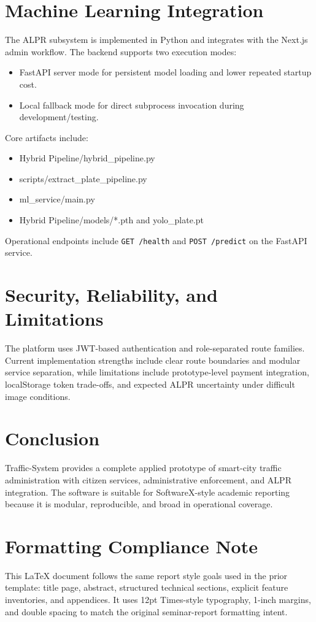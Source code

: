 \documentclass[12pt]{article}
\begin{document}
\section{Machine Learning Integration}
The ALPR subsystem is implemented in Python and integrates with the Next.js admin workflow. The backend supports two execution modes:
\begin{itemize}[leftmargin=*]
\item FastAPI server mode for persistent model loading and lower repeated startup cost.
\item Local fallback mode for direct subprocess invocation during development/testing.
\end{itemize}

Core artifacts include:
\begin{itemize}[leftmargin=*]
\item Hybrid Pipeline/hybrid_pipeline.py
\item scripts/extract_plate_pipeline.py
\item ml_service/main.py
\item Hybrid Pipeline/models/*.pth and yolo\_plate.pt
\end{itemize}

Operational endpoints include \texttt{GET /health} and \texttt{POST /predict} on the FastAPI service.

\section{Security, Reliability, and Limitations}
The platform uses JWT-based authentication and role-separated route families. Current implementation strengths include clear route boundaries and modular service separation, while limitations include prototype-level payment integration, localStorage token trade-offs, and expected ALPR uncertainty under difficult image conditions.

\section{Conclusion}
Traffic-System provides a complete applied prototype of smart-city traffic administration with citizen services, administrative enforcement, and ALPR integration. The software is suitable for SoftwareX-style academic reporting because it is modular, reproducible, and broad in operational coverage.

\appendix
\section{Formatting Compliance Note}
This LaTeX document follows the same report style goals used in the prior template: title page, abstract, structured technical sections, explicit feature inventories, and appendices. It uses 12pt Times-style typography, 1-inch margins, and double spacing to match the original seminar-report formatting intent.
\end{document}
